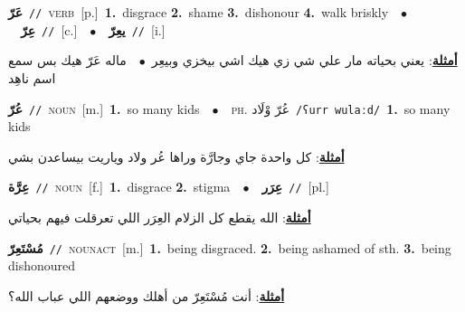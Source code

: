 \documentclass[10pt,a4paper,twoside]{article} %
\begin{document}
\begin{multicols}{2}
{\setlength\topsep{0pt}\textbf{\foreignlanguage{arabic}{عَرّ}}\ {\color{gray}\texttt{//}\color{black}}\ \textsc{verb}\ [p.]\ \textbf{1.}~disgrace  \textbf{2.}~shame  \textbf{3.}~dishonour  \textbf{4.}~walk briskly\ \ $\bullet$\ \ \setlength\topsep{0pt}\textbf{\foreignlanguage{arabic}{عِرّ}}\ {\color{gray}\texttt{//}\color{black}}\ [c.]\ \ $\bullet$\ \ \setlength\topsep{0pt}\textbf{\foreignlanguage{arabic}{يعِرّ}}\ {\color{gray}\texttt{//}\color{black}}\ [i.]\  \begin{flushright}\color{gray}\foreignlanguage{arabic}{\textbf{\underline{\foreignlanguage{arabic}{أمثلة}}}: يعني بحياته مار علي شي زي هيك اشي بيخزي وبيعِر\ $\bullet$\ \  ماله عَرّ هيك بس سمع اسم ناهِد}\end{flushright}\color{black}} \vspace{2mm}

{\setlength\topsep{0pt}\textbf{\foreignlanguage{arabic}{عُرّ}}\ {\color{gray}\texttt{//}\color{black}}\ \textsc{noun}\ [m.]\ \textbf{1.}~so many kids\ \ $\bullet$\ \ \textsc{ph.} \color{gray} \foreignlanguage{arabic}{عُرّ وْلَاد}\color{black}\ {\color{gray}\texttt{/{\sffamily ʕurr wulaːd}/}\color{black}}\ \textbf{1.}~so many kids\  \begin{flushright}\color{gray}\foreignlanguage{arabic}{\textbf{\underline{\foreignlanguage{arabic}{أمثلة}}}: كل واحدة جاي وجارَّة وراها عُر ولاد وياريت بيساعدن بشي}\end{flushright}\color{black}} \vspace{2mm}

{\setlength\topsep{0pt}\textbf{\foreignlanguage{arabic}{عِرَّة}}\ {\color{gray}\texttt{//}\color{black}}\ \textsc{noun}\ [f.]\ \textbf{1.}~disgrace  \textbf{2.}~stigma\ \ $\bullet$\ \ \setlength\topsep{0pt}\textbf{\foreignlanguage{arabic}{عِرَر}}\ {\color{gray}\texttt{//}\color{black}}\ [pl.]\  \begin{flushright}\color{gray}\foreignlanguage{arabic}{\textbf{\underline{\foreignlanguage{arabic}{أمثلة}}}: الله يقطع كل الزلام العِرَر اللي تعرقلت فيهم بحياتي}\end{flushright}\color{black}} \vspace{2mm}

{\setlength\topsep{0pt}\textbf{\foreignlanguage{arabic}{مُسْتَعِرّ}}\ {\color{gray}\texttt{//}\color{black}}\ \textsc{noun\textunderscore act}\ [m.]\ \textbf{1.}~being disgraced.  \textbf{2.}~being ashamed of sth.  \textbf{3.}~being dishonoured\  \begin{flushright}\color{gray}\foreignlanguage{arabic}{\textbf{\underline{\foreignlanguage{arabic}{أمثلة}}}: أنت مُسْتَعِرّ من أهلك ووضعهم اللي عباب الله؟}\end{flushright}\color{black}} \vspace{2mm}


\end{multicols}
\end{document}
